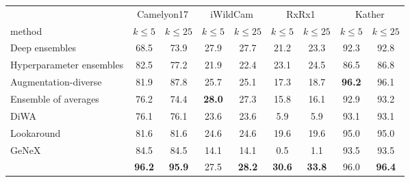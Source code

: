 \begin{tabular}{@{}lcccccccc@{}}
\toprule
& \multicolumn{2}{c}{Camelyon17} & \multicolumn{2}{c}{iWildCam} & \multicolumn{2}{c}{RxRx1} & \multicolumn{2}{c}{Kather} \\
\cmidrule(lr){2-3}\cmidrule(lr){4-5}\cmidrule(lr){6-7}\cmidrule(lr){8-9}
method & $k\le5$ & $k\le25$ & $k\le5$ & $k\le25$ & $k\le5$ & $k\le25$ & $k\le5$ & $k\le25$ \\
\midrule
Deep ensembles & 68.5 & 73.9 & 27.9 & 27.7 & 21.2 & 23.3 & 92.3 & 92.8 \\
Hyperparameter ensembles & 82.5 & 77.2 & 21.9 & 22.4 & 23.1 & 24.5 & 86.5 & 86.8 \\
Augmentation-diverse & 81.9 & 87.8 & 25.7 & 25.1 & 17.3 & 18.7 & \textbf{96.2} & 96.1 \\
Ensemble of averages & 76.2 & 74.4 & \textbf{28.0} & 27.3 & 15.8 & 16.1 & 92.9 & 93.2 \\
DiWA & 76.1 & 76.1 & 23.6 & 23.6 & 5.9 & 5.9 & 93.1 & 93.1 \\
Lookaround & 81.6 & 81.6 & 24.6 & 24.6 & 19.6 & 19.6 & 95.0 & 95.0 \\
GeNeX & 84.5 & 84.5 & 14.1 & 14.1 & 0.5 & 1.1 & 93.5 & 93.5 \\
\midrule
\method{} & \textbf{96.2} & \textbf{95.9} & 27.5 & \textbf{28.2} & \textbf{30.6} & \textbf{33.8} & 96.0 & \textbf{96.4} \\
\bottomrule
\end{tabular}
